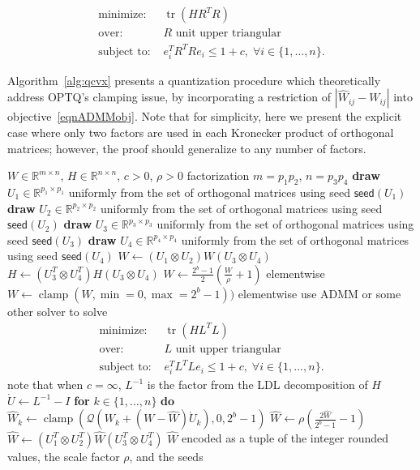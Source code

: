 \begin{align}
    \mbox{minimize: } & \operatorname{tr}\left(H R^T R\right) \nonumber\\
    \mbox{over: } & R \text{ unit upper triangular} \label{eqnADMMobj}\\
    \mbox{subject to: } & e_i^T R^T R e_i \le 1 + c, \; \forall i \in \{1,\ldots,n\}.\nonumber
\end{align}

\begin{toappendix}
Algorithm~\ref{alg:qcvx} presents a quantization procedure which theoretically address OPTQ's clamping issue, by incorporating a restriction of $|\hat W_{ij} - W_{ij}|$ into objective~\eqref{eqnADMMobj}.
Note that for simplicity, here we present the explicit case where only two factors are used in each Kronecker product of orthogonal matrices; however, the proof should generalize to any number of factors.
\begin{algorithm}
\caption{``Fixed'' Rounding via a Convex Program}\label{alg:qcvx}
\begin{algorithmic}
\Require $W \in \mathbb{R}^{m \times n}$, $H \in \mathbb{R}^{n \times n}$, $c > 0$, $\rho > 0$
\Require factorization $m = p_1 p_2$, $n = p_3 p_4$
\State \textbf{draw } $U_1 \in \mathbb{R}^{p_1 \times p_1}$ uniformly from the set of orthogonal matrices using seed $\mathsf{seed}(U_1)$
\State \textbf{draw } $U_2 \in \mathbb{R}^{p_2 \times p_2}$ uniformly from the set of orthogonal matrices using seed $\mathsf{seed}(U_2)$
\State \textbf{draw } $U_3 \in \mathbb{R}^{p_3 \times p_3}$ uniformly from the set of orthogonal matrices using seed $\mathsf{seed}(U_3)$
\State \textbf{draw } $U_4 \in \mathbb{R}^{p_4 \times p_4}$ uniformly from the set of orthogonal matrices using seed $\mathsf{seed}(U_4)$
\State $W \gets (U_1 \otimes U_2) W (U_3 \otimes U_4)$
\State $H \gets (U_3^T \otimes U_4^T) H (U_3 \otimes U_4)$
\State $W \gets \frac{2^b - 1}{2} \left( \frac{W}{\rho} + 1 \right)$ elementwise \State $W \gets \operatorname{clamp}(W, \min=0, \max=2^{b}-1))$ elementwise \State use ADMM or some other solver to solve
\begin{align*}
    \mbox{minimize: } & \operatorname{tr}\left(H L^T L\right) \\
    \mbox{over: } & L \text{ unit upper triangular} \\
    \mbox{subject to: } & e_i^T L^T L e_i \le 1 + c, \; \forall i \in \{1,\ldots,n\}.
\end{align*}
\State note that when $c = \infty$, $L^{-1}$ is the factor from the LDL decomposition of $H$
\State $\grave{U} \gets L^{-1} - I$
\State \textbf{for} $k \in \{1, \dots, n\}$ \textbf{do} 
$\hat W_k \gets \operatorname{clamp}(\mathcal{Q}( W_k + (W - \hat W) \grave{U}_k ), 0, 2^b-1)$ 
\State $\hat W \gets \rho \left( \frac{2 \hat W}{2^b - 1} - 1 \right)$
\State $\hat W \gets (U_1^T \otimes U_2^T) \hat W (U_3^T \otimes U_4^T)$
\State \Return $\hat W$ encoded as a tuple of the integer rounded values, the scale factor $\rho$, and the seeds
\end{algorithmic}
\end{algorithm}


\end{toappendix}
